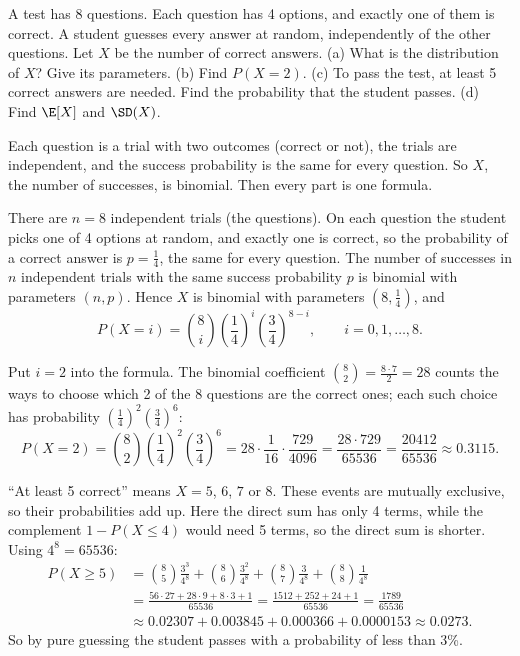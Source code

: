 
\begin{problem}
	A test has 8 questions. Each question has 4 options, and exactly one of
	them is correct. A student guesses every answer at random, independently
	of the other questions. Let $X$ be the number of correct answers.
	(a) What is the distribution of $X$? Give its parameters.
	(b) Find $P(X=2)$.
	(c) To pass the test, at least 5 correct answers are needed. Find the
	probability that the student passes.
	(d) Find $\E[X]$ and $\SD(X)$.
\end{problem}

\begin{solution}
	\idea Each question is a trial with two outcomes (correct or not), the
	trials are independent, and the success probability is the same for every
	question. So $X$, the number of successes, is binomial. Then every part
	is one formula.

	 There are $n=8$ independent trials (the questions). On each
	question the student picks one of 4 options at random, and exactly one is
	correct, so the probability of a correct answer is $p=\frac14$, the same
	for every question. The number of successes in $n$ independent trials with
	the same success probability $p$ is binomial with parameters $(n,p)$.
	Hence $X$ is binomial with parameters $(8,\frac14)$, and
	\[
		P(X=i)=\binom{8}{i}\left(\frac14\right)^i\left(\frac34\right)^{8-i},
		\qquad i=0,1,\dots,8.
	\]

	 Put $i=2$ into the formula. The binomial coefficient
	$\binom82=\frac{8\cdot7}{2}=28$ counts the ways to choose which 2 of the
	8 questions are the correct ones; each such choice has probability
	$\left(\frac14\right)^2\left(\frac34\right)^6$:
	\[
		P(X=2)=\binom{8}{2}\left(\frac14\right)^2\left(\frac34\right)^6
		=28\cdot\frac{1}{16}\cdot\frac{729}{4096}
		=\frac{28\cdot729}{65536}=\frac{20412}{65536}\approx0.3115.
	\]

	 ``At least 5 correct'' means $X=5$, $6$, $7$ or $8$. These
	events are mutually exclusive, so their probabilities add up. Here the
	direct sum has only 4 terms, while the complement $1-P(X\le4)$ would need
	5 terms, so the direct sum is shorter. Using $4^8=65536$:
	\[
		\begin{aligned}
			P(X\ge5) & =\binom85\frac{3^3}{4^8}+\binom86\frac{3^2}{4^8}
			+\binom87\frac{3}{4^8}+\binom88\frac{1}{4^8}                     \\
			         & =\frac{56\cdot27+28\cdot9+8\cdot3+1}{65536}
			=\frac{1512+252+24+1}{65536}=\frac{1789}{65536}                   \\
			         & \approx0.02307+0.003845+0.000366+0.0000153\approx0.0273.
		\end{aligned}
	\]
	So by pure guessing the student passes with a probability of less than
	3\%.


\end{solution}
